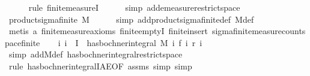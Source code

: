 \begin{isabellebody}
\ \ \ \ \isamarkupfalse%
\ {\isacharparenleft}{\kern0pt}rule\ finite{\isacharunderscore}{\kern0pt}measureI{\isacharparenright}{\kern0pt}\isanewline
\ \ \ \ \isamarkupfalse%
\ {\isacharparenleft}{\kern0pt}simp\ add{\isacharcolon}{\kern0pt}emeasure{\isacharunderscore}{\kern0pt}restrict{\isacharunderscore}{\kern0pt}space{\isacharparenright}{\kern0pt}\isanewline
\isanewline
\ \ \isamarkupfalse%
\ product{\isacharunderscore}{\kern0pt}sigma{\isacharunderscore}{\kern0pt}finite\ M{\isacharprime}{\kern0pt}\isanewline
\ \ \ \ \isamarkupfalse%
\ {\isacharparenleft}{\kern0pt}simp\ add{\isacharcolon}{\kern0pt}product{\isacharunderscore}{\kern0pt}sigma{\isacharunderscore}{\kern0pt}finite{\isacharunderscore}{\kern0pt}def\ M{\isacharprime}{\kern0pt}{\isacharunderscore}{\kern0pt}def{\isacharparenright}{\kern0pt}\isanewline
\ \ \ \ \isamarkupfalse%
\ {\isacharparenleft}{\kern0pt}metis\ a\ finite{\isacharunderscore}{\kern0pt}measure{\isachardot}{\kern0pt}axioms{\isacharparenleft}{\kern0pt}{}{\isacharparenright}{\kern0pt}\ finite{\isachardot}{\kern0pt}emptyI\ finite{\isacharunderscore}{\kern0pt}insert\ sigma{\isacharunderscore}{\kern0pt}finite{\isacharunderscore}{\kern0pt}measure{\isacharunderscore}{\kern0pt}count{\isacharunderscore}{\kern0pt}space{\isacharunderscore}{\kern0pt}finite{\isacharparenright}{\kern0pt}\isanewline
\isanewline
\ \ \isamarkupfalse%
\ {\isachardoublequoteopen}{\isasymAnd}i{\isachardot}{\kern0pt}\ i\ {\isasymin}\ I\ {\isasymLongrightarrow}\ has{\isacharunderscore}{\kern0pt}bochner{\isacharunderscore}{\kern0pt}integral\ {\isacharparenleft}{\kern0pt}M{\isacharprime}{\kern0pt}\ i{\isacharparenright}{\kern0pt}\ {\isacharparenleft}{\kern0pt}f\ i{\isacharparenright}{\kern0pt}\ {\isacharparenleft}{\kern0pt}r\ i{\isacharparenright}{\kern0pt}{\isachardoublequoteclose}\isanewline
\ \ \ \ \isamarkupfalse%
\ {\isacharparenleft}{\kern0pt}simp\ add{\isacharcolon}{\kern0pt}M{\isacharprime}{\kern0pt}{\isacharunderscore}{\kern0pt}def\ has{\isacharunderscore}{\kern0pt}bochner{\isacharunderscore}{\kern0pt}integral{\isacharunderscore}{\kern0pt}restrict{\isacharunderscore}{\kern0pt}space{\isacharparenright}{\kern0pt}\isanewline
\ \ \ \ \isamarkupfalse%
\ {\isacharparenleft}{\kern0pt}rule\ has{\isacharunderscore}{\kern0pt}bochner{\isacharunderscore}{\kern0pt}integralI{\isacharunderscore}{\kern0pt}AE{\isacharbrackleft}{\kern0pt}OF\ assms{\isacharparenleft}{\kern0pt}{}{\isacharparenright}{\kern0pt}{\isacharbrackright}{\kern0pt}{\isacharcomma}{\kern0pt}\ simp{\isacharcomma}{\kern0pt}\ simp{\isacharparenright}{\kern0pt}\isanewline

\end{isabellebody}
